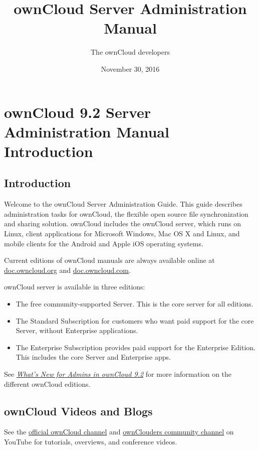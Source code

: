 \documentclass[letterpaper,10pt,english]{sphinxmanual}
\title{ownCloud Server Administration Manual}
\date{November 30, 2016}
\author{The ownCloud developers}
\begin{document}
\maketitle
\tableofcontents
{}\label{contents::doc}



\chapter{ownCloud 9.2 Server Administration Manual Introduction}
\label{index::doc}\label{index:table-of-contents}\label{index:owncloud-version-server-administration-manual-introduction}

\section{Introduction}
\label{index:introduction}
Welcome to the ownCloud Server Administration Guide. This guide describes
administration tasks for ownCloud, the flexible open source file synchronization
and sharing solution. ownCloud includes the ownCloud server, which runs on
Linux, client applications for Microsoft Windows, Mac OS X and Linux, and mobile
clients for the Android and Apple iOS operating systems.

Current editions of ownCloud manuals are always available online at
\href{https://doc.owncloud.org/}{doc.owncloud.org} and \href{https://doc.owncloud.com/}{doc.owncloud.com}.

ownCloud server is available in three editions:
\begin{itemize}
\item {} 
The free community-supported Server. This is the core server for all editions.

\item {} 
The Standard Subscription for customers who want paid support for the core
Server, without Enterprise applications.

\item {} 
The Enterprise Subscription provides paid support for the Enterprise Edition.
This includes the core Server and Enterprise apps.

\end{itemize}

See {\hyperref[whats_new_admin::doc]{\emph{\emph{What's New for Admins in ownCloud 9.2}}}} for more information on the different ownCloud
editions.


\section{ownCloud Videos and Blogs}
\label{index:owncloud-videos-and-blogs}
See the \href{https://www.youtube.com/channel/UC\_4gez4lsWqciH-otOlXo5w}{official ownCloud channel} and \href{https://www.youtube.com/channel/UCA8Ehsdu3KaxSz5KOcCgHbw}{ownClouders
community channel}
on YouTube for tutorials, overviews, and conference videos.
\end{document}
